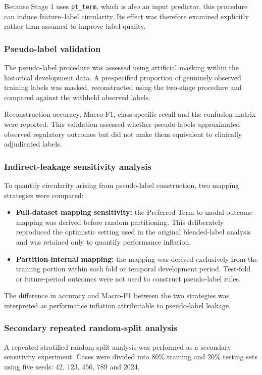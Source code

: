 \documentclass[10pt]{article}
\begin{document}
Because Stage 1 uses \texttt{pt\_term}, which is also an input predictor, this procedure can induce feature--label circularity. Its effect was therefore examined explicitly rather than assumed to improve label quality.

\subsubsection{Pseudo-label validation}
The pseudo-label procedure was assessed using artificial masking within the historical development data. A prespecified proportion of genuinely observed training labels was masked, reconstructed using the two-stage procedure and compared against the withheld observed labels.

Reconstruction accuracy, Macro-F1, class-specific recall and the confusion matrix were reported. This validation assessed whether pseudo-labels approximated observed regulatory outcomes but did not make them equivalent to clinically adjudicated labels.

\subsubsection{Indirect-leakage sensitivity analysis}
To quantify circularity arising from pseudo-label construction, two mapping strategies were compared:
\begin{itemize}
\item \textbf{Full-dataset mapping sensitivity:} the Preferred Term-to-modal-outcome mapping was derived before random partitioning. This deliberately reproduced the optimistic setting used in the original blended-label analysis and was retained only to quantify performance inflation.
\item \textbf{Partition-internal mapping:} the mapping was derived exclusively from the training portion within each fold or temporal development period. Test-fold or future-period outcomes were not used to construct pseudo-label rules.
\end{itemize}
The difference in accuracy and Macro-F1 between the two strategies was interpreted as performance inflation attributable to pseudo-label leakage.

\subsubsection{Secondary repeated random-split analysis}
A repeated stratified random-split analysis was performed as a secondary sensitivity experiment. Cases were divided into 80\% training and 20\% testing sets using five seeds: 42, 123, 456, 789 and 2024.
\end{document}
